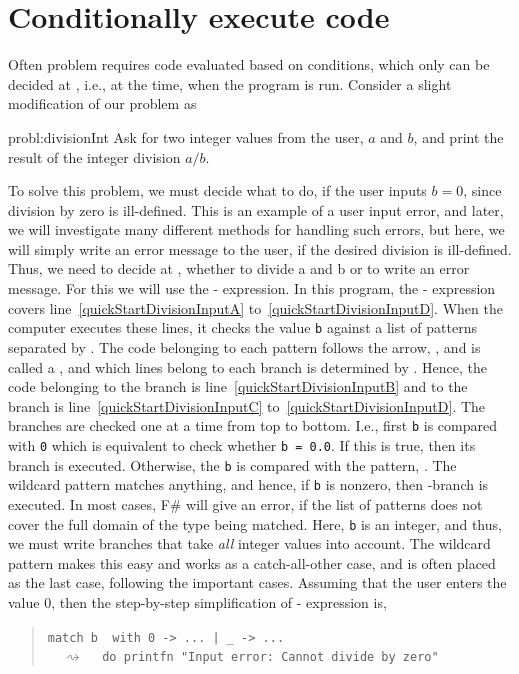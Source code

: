 \documentclass[fsharpNotes.tex]{subfiles}
\begin{document}
\section{Conditionally execute code}
Often problem requires code evaluated based on conditions, which only can be decided at , i.e., at the time, when the program is run. Consider a slight modification of our problem as
%
\begin{task}{probl:divisionInt}
  Ask for two integer values from the user, $a$ and $b$, and print the result of the integer division $a/b$.
\end{task}
%
To solve this problem, we must decide what to do, if the user inputs $b=0$, since division by zero is ill-defined. This is an example of a user input error, and later, we will investigate many different methods for handling such errors, but here, we will simply write an error message to the user, if the desired division is ill-defined. Thus, we need to decide at , whether to divide a and b or to write an error message. For this we will use the - expression.   
% 
%
In this program, the - expression covers line~\ref{quickStartDivisionInputA} to~\ref{quickStartDivisionInputD}. When the computer executes these lines, it checks the value \lstinline{b} against a list of patterns separated by \lexeme{|}. The code belonging to each pattern follows the arrow, \lexeme{->}, and is called a , and which lines belong to each branch is determined by . Hence, the code belonging to the  branch is line~\ref{quickStartDivisionInputB} and to the \lexeme{_} branch is line~\ref{quickStartDivisionInputC} to~\ref{quickStartDivisionInputD}. The branches are checked one at a time from top to bottom. I.e., first \lstinline{b} is compared with \lstinline{0} which is equivalent to check whether \lstinline{b = 0.0}. If this is true, then its branch is executed. Otherwise, the \lstinline{b} is compared with the  pattern, \lexeme{_}. The wildcard pattern matches anything, and hence, if \lstinline{b} is nonzero, then \lexeme{_}-branch is executed. In most cases, F\# will give an error, if the list of patterns does not cover the full domain of the type being matched. Here, \lstinline{b} is an integer, and thus, we must write branches that take \emph{all} integer values into account. The wildcard pattern makes this easy and works as a catch-all-other case, and is often placed as the last case, following the important cases. Assuming that the user enters the value 0, then the step-by-step simplification of - expression is, 
\begin{quote}
  \lstinline{match b  with 0 -> ... | _ -> ...}\\ $\quad\rightsquigarrow\quad$ \lstinline{do printfn "Input error: Cannot divide by zero"}
\end{quote}
\end{document}

